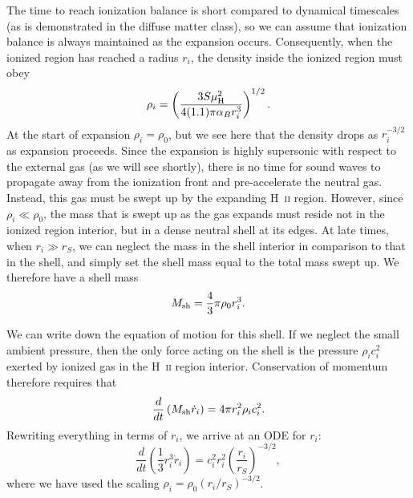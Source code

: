 The time to reach ionization balance is short compared to dynamical timescales (as is demonstrated in the diffuse matter class), so we can assume that ionization balance is always maintained as the expansion occurs. Consequently, when the ionized region has reached a radius $r_i$, the density inside the ionized region must obey
\begin{equation}
\rho_i = \left(\frac{3 S \mu_{\rm H}^2}{4(1.1)\pi \alpha_B r_i^3}\right)^{1/2}.
\end{equation}
At the start of expansion $\rho_i = \rho_0$, but we see here that the density drops as $r_i^{-3/2}$ as expansion proceeds. Since the expansion is highly supersonic with respect to the external gas (as we will see shortly), there is no time for sound waves to propagate away from the ionization front and pre-accelerate the neutral gas. Instead, this gas must be swept up by the expanding H~\textsc{ii} region. However, since $\rho_i \ll \rho_0$, the mass that is swept up as the gas expands must reside not in the ionized region interior, but in a dense neutral shell at its edges. At late times, when $r_i \gg r_S$, we can neglect the mass in the shell interior in comparison to that in the shell, and simply set the shell mass equal to the total mass swept up. We therefore have a shell mass
\begin{equation}
M_{\rm sh} = \frac{4}{3} \pi \rho_0 r_i^3.
\end{equation}

We can write down the equation of motion for this shell. If we neglect the small ambient pressure, then the only force acting on the shell is the pressure $\rho_i c_i^2$ exerted by ionized gas in the H~\textsc{ii} region interior. Conservation of momentum therefore requires that
\begin{equation}
\frac{d}{dt} \left(M_{\rm sh} \dot{r}_i\right) = 4\pi r_i^2 \rho_i c_i^2.
\end{equation}
Rewriting everything in terms of $r_i$, we arrive at an ODE for $r_i$:
\begin{equation}
\frac{d}{dt} \left(\frac{1}{3} r_i^3 \dot{r}_i\right) = c_i^2 r_i^2 \left(\frac{r_i}{r_S}\right)^{-3/2},
\end{equation}
where we have used the scaling $\rho_i = \rho_0 (r_i/r_S)^{-3/2}$.

